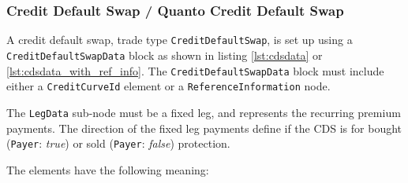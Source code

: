 \subsubsection{Credit Default Swap / Quanto Credit Default Swap}

A credit default swap, trade type \lstinline!CreditDefaultSwap!, is set up using a \lstinline!CreditDefaultSwapData! block as shown in listing \ref{lst:cdsdata} or \ref{lst:cdsdata_with_ref_info}. The \lstinline!CreditDefaultSwapData! block must include either a \lstinline!CreditCurveId! element or a \lstinline!ReferenceInformation! node. 

The {\tt LegData} sub-node must be a fixed leg, and  represents the recurring premium payments. The direction of the fixed leg payments define if the CDS is for bought (\lstinline!Payer!: \emph{true}) or sold (\lstinline!Payer!: \emph{false}) protection.

The elements have the following meaning:

